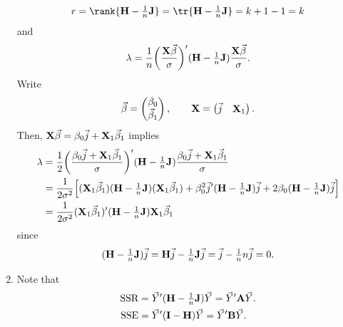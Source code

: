 \begin{Theorem}{}{}
\begin{enumerate}[(1)]
              \[ r=\rank{\Matrix{H}-\tfrac{1}{n}\Matrix{J}}=\tr{\Matrix{H}-\tfrac{1}{n}\Matrix{J}}=k+1-1=k \]
              and
              \[ \lambda=\frac{1}{n}\biggl(\frac{\mathbf{X}\vec{\beta}}{\sigma}\biggr)'(\mathbf{H}-\tfrac{1}{n}\mathbf{J})\frac{\mathbf{X}\vec{\beta}}{\sigma}. \]
              Write
              \[ \vec{\beta}=\begin{pmatrix}
                      \beta_0 \\
                      \vec{\beta}_1
                  \end{pmatrix},\qquad
                  \mathbf{X}=\begin{pmatrix}
                      \vec{j} & \mathbf{X}_1
                  \end{pmatrix}. \]
              Then, $ \mathbf{X}\vec{\beta}=\beta_0 \vec{j}+\mathbf{X}_1 \vec{\beta}_1 $ implies
              \begin{align*}
                  \lambda
                   & =\frac{1}{2}\biggl(\frac{\beta_0 \vec{j}+\mathbf{X}_1 \vec{\beta}_1}{\sigma}\biggr)'
                  (\mathbf{H}-\tfrac{1}{n}\mathbf{J})\frac{\beta_0 \vec{j}+\mathbf{X}_1 \vec{\beta}_1}{\sigma}                                                                                                \\
                   & =\frac{1}{2\sigma^2}\Bigl[(\mathbf{X}_1 \vec{\beta}_1)(\mathbf{H}-\tfrac{1}{n}\mathbf{J})(\mathbf{X}_1 \vec{\beta}_1)+\beta_0^2 \vec{j}'(\mathbf{H}-\tfrac{1}{n}\mathbf{J})\vec{j}
                  +2 \beta_0(\mathbf{H}-\tfrac{1}{n}\mathbf{J})\vec{j}\Bigr]                                                                                                                                     \\
                   & =\frac{1}{2\sigma^2}(\mathbf{X}_1\vec{\beta}_1)'(\mathbf{H}-\tfrac{1}{n}\mathbf{J})\mathbf{X}_1 \vec{\beta}_1
              \end{align*}
              since
              \[ (\mathbf{H}-\tfrac{1}{n}\mathbf{J})\vec{j}=\mathbf{H}\vec{j}-\tfrac{1}{n}\mathbf{J}\vec{j}=\vec{j}-\tfrac{1}{n}n \vec{j}=0. \]
        \item Note that
              \begin{align*}
                  \SSR & =\Vector{Y}'(\Matrix{H}-\tfrac{1}{n}\Matrix{J})\Vector{Y}=\Vector{Y}'\Matrix{A}\Vector{Y}. \\
                  \SSE & =\Vector{Y}'(\Matrix{I}-\Matrix{H})\Vector{Y}=\Vector{Y}'\Matrix{B}\Vector{Y}.

\end{align*}
\end{enumerate}
\end{Theorem}

